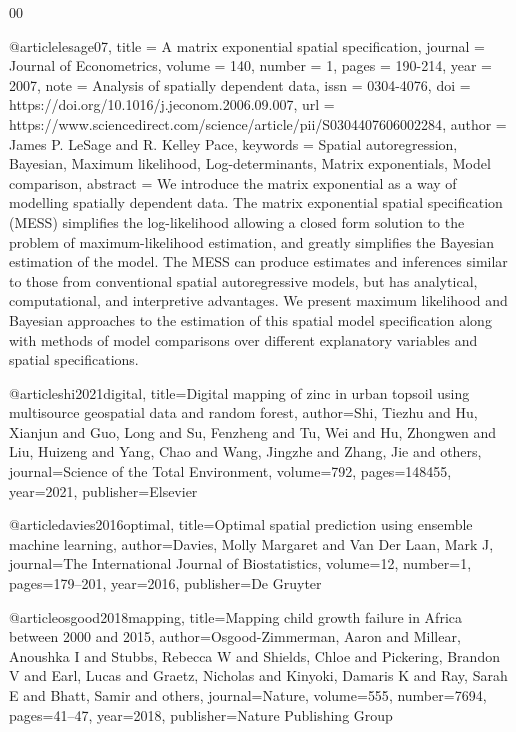 \documentclass[preprint,12pt]{elsarticle}
\begin{document}
\begin{thebibliography}{00}
{@article{lesage07,
title = {{A matrix exponential spatial specification}},
journal = {Journal of Econometrics},
volume = {140},
number = {1},
pages = {190-214},
year = {2007},
note = {Analysis of spatially dependent data},
issn = {0304-4076},
doi = {https://doi.org/10.1016/j.jeconom.2006.09.007},
url = {https://www.sciencedirect.com/science/article/pii/S0304407606002284},
author = {James P. LeSage and R. {Kelley Pace}},
keywords = {Spatial autoregression, Bayesian, Maximum likelihood, Log-determinants, Matrix exponentials, Model comparison},
abstract = {We introduce the matrix exponential as a way of modelling spatially dependent data. The matrix exponential spatial specification (MESS) simplifies the log-likelihood allowing a closed form solution to the problem of maximum-likelihood estimation, and greatly simplifies the Bayesian estimation of the model. The MESS can produce estimates and inferences similar to those from conventional spatial autoregressive models, but has analytical, computational, and interpretive advantages. We present maximum likelihood and Bayesian approaches to the estimation of this spatial model specification along with methods of model comparisons over different explanatory variables and spatial specifications.}
}

@article{shi2021digital,
  title={{Digital mapping of zinc in urban topsoil using multisource geospatial data and random forest}},
  author={Shi, Tiezhu and Hu, Xianjun and Guo, Long and Su, Fenzheng and Tu, Wei and Hu, Zhongwen and Liu, Huizeng and Yang, Chao and Wang, Jingzhe and Zhang, Jie and others},
  journal={Science of the Total Environment},
  volume={792},
  pages={148455},
  year={2021},
  publisher={Elsevier}
}

@article{davies2016optimal,
  title={{Optimal spatial prediction using ensemble machine learning}},
  author={Davies, Molly Margaret and Van Der Laan, Mark J},
  journal={The International Journal of Biostatistics},
  volume={12},
  number={1},
  pages={179--201},
  year={2016},
  publisher={De Gruyter}
}

@article{osgood2018mapping,
  title={{Mapping child growth failure in Africa between 2000 and 2015}},
  author={Osgood-Zimmerman, Aaron and Millear, Anoushka I and Stubbs, Rebecca W and Shields, Chloe and Pickering, Brandon V and Earl, Lucas and Graetz, Nicholas and Kinyoki, Damaris K and Ray, Sarah E and Bhatt, Samir and others},
  journal={Nature},
  volume={555},
  number={7694},
  pages={41--47},
  year={2018},
  publisher={Nature Publishing Group}
}

}
\end{thebibliography}
\end{document}
